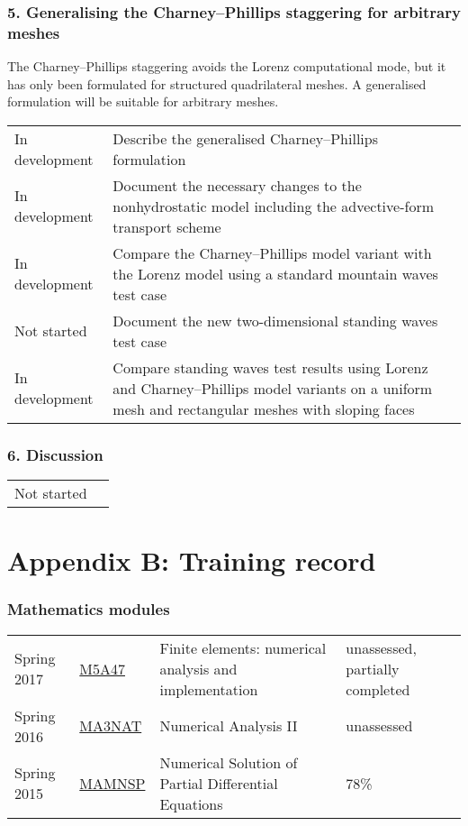\documentclass[a4paper,11pt]{article}
\begin{document}
\subsubsection*{5. Generalising the Charney--Phillips staggering for arbitrary meshes}
\noindent The Charney--Phillips staggering avoids the Lorenz computational mode, but it has only been formulated for structured quadrilateral meshes.  A generalised formulation will be suitable for arbitrary meshes.
\vspace*{0.5em}

\begin{tabularx}{\linewidth}{>{\hsize=1.3in}X X}
	In development & Describe the generalised Charney--Phillips formulation \\
	In development & Document the necessary changes to the nonhydrostatic model including the advective-form transport scheme \\
	In development & Compare the Charney--Phillips model variant with the Lorenz model using a standard mountain waves test case \citep{schaer2002} \\
	Not started & Document the new two-dimensional standing waves test case \\
	In development & Compare standing waves test results using Lorenz and Charney--Phillips model variants on a uniform mesh and rectangular meshes with sloping faces
\end{tabularx}

\subsubsection*{6. Discussion}
\vspace*{0.5em}

\begin{tabularx}{\linewidth}{>{\hsize=0.9in}X X}
Not started & 
\end{tabularx}


\newpage

\section*{Appendix B: Training record}

\subsubsection*{Mathematics modules}
\begin{tabular}{l l l l}
Spring 2017	& \href{https://finite-element.github.io}{M5A47}  & Finite elements: numerical analysis and implementation & unassessed, partially completed \\
Spring 2016	& \href{www.reading.ac.uk/module/document.aspx?modP=MA3NAT&modYR=1516}{MA3NAT} & Numerical Analysis II & unassessed \\
Spring 2015	& \href{www.reading.ac.uk/modules/document.aspx?modP=MAMNSP&modYR=1415}{MAMNSP} & Numerical Solution of Partial Differential Equations  & 78\% \\
\end{tabular}
\end{document}
